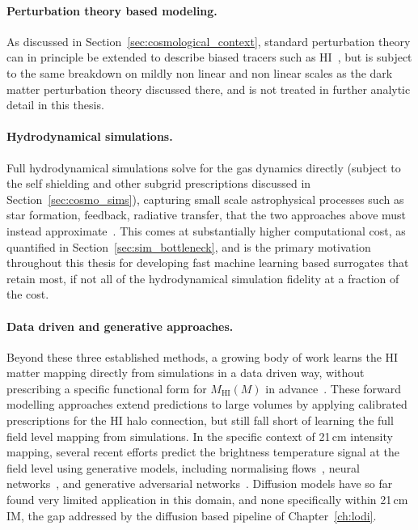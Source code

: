 \paragraph{Perturbation theory based modeling.} As discussed in Section~\ref{sec:cosmological_context}, standard perturbation theory can in principle be extended to describe biased tracers such as HI~\citep{obuljen23}, but is subject to the same breakdown on mildly non linear and non linear scales as the dark matter perturbation theory discussed there, and is not treated in further analytic detail in this thesis.




\paragraph{Hydrodynamical simulations.} Full hydrodynamical simulations solve 
for the gas dynamics directly (subject to the self shielding and other subgrid 
prescriptions discussed in Section~\ref{sec:cosmo_sims}), capturing small scale 
astrophysical processes such as star formation, feedback, radiative transfer, that 
the two approaches above must instead approximate~\citep{villaescusa-navarro_ingredients_2018}. 
This comes at substantially higher computational cost, as quantified in 
Section~\ref{sec:sim_bottleneck}, and is the primary motivation throughout this 
thesis for developing fast machine learning based surrogates that retain most, if not all of the hydrodynamical simulation fidelity at a fraction of the cost.

\paragraph{Data driven and generative approaches.} Beyond these three established 
methods, a growing body of work learns the HI matter mapping directly from 
simulations in a data driven way, without prescribing a specific functional form 
for $M_\text{HI}(M)$ in 
advance~\citep[e.g.][]{hitz2025fastsimulationcosmologicalneutral,li2022theoreticalmodelsatomichydrogen,spinelli_atomic_2020}. 
These forward modelling approaches extend predictions to large volumes by applying 
calibrated prescriptions for the HI halo connection, but still fall short of 
learning the full field level mapping from simulations. In the specific context 
of 21\,cm intensity mapping, several recent efforts predict the brightness 
temperature signal at the field level using generative models, including 
normalising flows~\citep{hassan_hiflow_2022}, neural 
networks~\citep{wadekar_hinet_2021}, and generative adversarial 
networks~\citep{andrianomena_emulating_2022}. Diffusion models have so far found 
very limited application in this domain, and none 
specifically within 21\,cm IM, the gap addressed by the diffusion based pipeline 
of Chapter~\ref{ch:lodi}.



